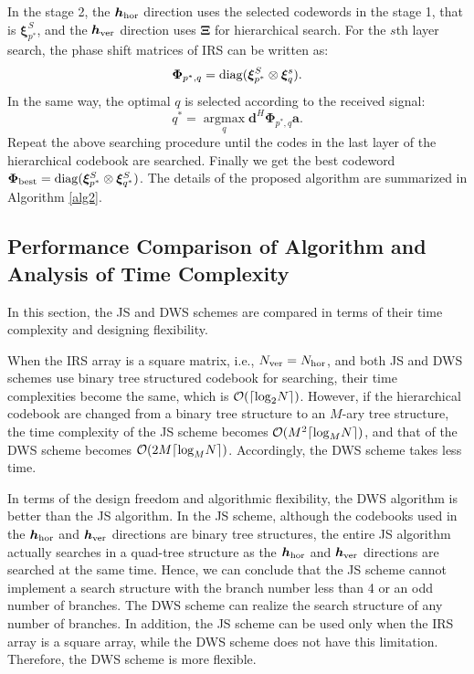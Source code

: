 \documentclass[12pt,draftclsnofoot,onecolumn]{IEEEtran}
\begin{document}
	
	In the stage 2, the ${\bm h}_{\rm hor}$ direction uses the selected codewords in the stage 1, that is ${\bm \xi}^S_{p^*}$, and the ${\bm h}_{\rm ver}$ direction uses $\bm \Xi$ for hierarchical search. For the $s$th layer search, the phase shift matrices of IRS can be written as:
	\begin{equation}\label{DWSPhi2}	
		{\bm \Phi}_{p^*,q}={\rm diag}({\bm \xi}^S_{p^*} \otimes {\bm \xi}^s_q).
	\end{equation}	
	In the same way, the optimal $q$ is selected according to the received signal:
	\begin{equation}\label{DWSq*}	
		q^*=\mathop{\arg\max}\limits_{q}{\bm d}^H  {\bm \Phi}_{p^*,q} {\bm a} .
	\end{equation}	
	Repeat the above searching procedure until the codes in the  last layer of the hierarchical codebook are searched. Finally we get the best codeword ${\bm \Phi}_{\rm best}={\rm diag}({\bm \xi}^S_{p^*} \otimes {\bm \xi}^S_{q^*})$. The details of the proposed algorithm are summarized in Algorithm  \ref{alg2}.
	
	\subsection{Performance Comparison of Algorithm and Analysis of Time Complexity}	
	In this section, the JS and DWS schemes are compared in terms of their time complexity and designing  flexibility. 
	
	When the IRS array is a square matrix, i.e., $N_{\rm ver}=N_{\rm hor}$, and both JS and DWS schemes use binary tree structured codebook for searching, their time complexities become the same, which is $\mathcal{O}(\lceil{\rm log}_2N\rceil)$. However, if the hierarchical codebook are changed from a binary tree structure to an $M$-ary tree structure, the time complexity of the JS scheme becomes $\mathcal{O}(M^2\lceil{\rm log}_M N\rceil)$, and that of the DWS scheme becomes  $\mathcal{O}(2M\lceil{\rm log}_M N\rceil)$. Accordingly, the DWS scheme takes less time.
	
	In terms of the  design freedom and algorithmic flexibility, the DWS algorithm  is better than the JS algorithm. In the JS scheme, although the codebooks used in the ${\bm h}_{\rm hor}$ and ${\bm h}_{\rm ver}$ directions are binary tree structures, the entire JS algorithm actually searches in a quad-tree structure as the ${\bm h}_{\rm hor}$  and  ${\bm h}_{\rm ver}$ directions are searched at the same time. Hence, we can conclude that the JS scheme cannot implement a search structure with the branch  number less than 4 or an odd number of branches.  The DWS scheme can realize the search structure of any number of branches. In addition, the JS scheme can  be used only when the IRS array is a square array, while the DWS scheme does not have this limitation. Therefore, the DWS scheme is more flexible.
	
\end{document}
